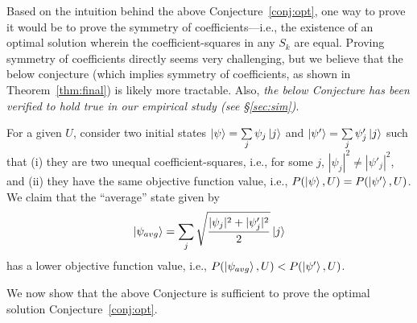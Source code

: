 
 Based on the intuition behind the above Conjecture~\ref{conj:opt}, one way to prove it would be to prove the symmetry of coefficients---i.e., the existence of an optimal solution wherein the coefficient-squares in any $S_k$ are equal. Proving symmetry of coefficients directly seems very challenging, but we believe that the below conjecture (which implies symmetry of coefficients, as shown in Theorem~\ref{thm:final}) is likely more tractable. Also, {\em the below Conjecture has been verified to hold true in our empirical study (see \S\ref{sec:sim})}. 

\begin{conjecture}
For a given $U$,
consider two initial states 
$\ket{\psi} = \sum\limits_j \psi_j \ket{j}$ and 
$\ket{\psi'} = \sum\limits_j \psi'_j \ket{j}$
such that (i) they are two unequal coefficient-squares, i.e., for some $j$, $|\psi_j|^2 \neq |\psi'_j|^2$, 
and 
(ii) they have the same objective function value, i.e., $P(\ket{\psi}, U) = P(\ket{\psi'}, U)$. 
We claim that the ``average'' state given by 
$$\ket{\psi_{avg}} = \sum_j \sqrt{\frac{|\psi_j|^2 + |\psi'_j|^2}{2}}  \ket{j}$$ 
has a lower objective function value, i.e., $P(\ket{\psi_{avg}}, U) < P(\ket{\psi'}, U)$.
\label{conj:avg}
\end{conjecture}

We now show that the above Conjecture is sufficient to prove the optimal solution Conjecture~\ref{conj:opt}.

